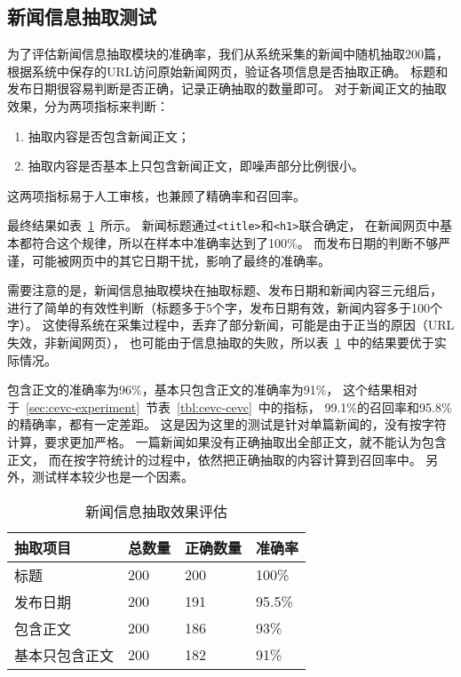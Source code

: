 \subsection{新闻信息抽取测试}

为了评估新闻信息抽取模块的准确率，我们从系统采集的新闻中随机抽取200篇，
根据系统中保存的URL访问原始新闻网页，验证各项信息是否抽取正确。
标题和发布日期很容易判断是否正确，记录正确抽取的数量即可。
对于新闻正文的抽取效果，分为两项指标来判断：
\begin{enumerate}
\item 抽取内容是否包含新闻正文；
\item 抽取内容是否基本上只包含新闻正文，即噪声部分比例很小。
\end{enumerate}
这两项指标易于人工审核，也兼顾了精确率和召回率。

最终结果如表~\ref{tbl:title-date}~所示。
新闻标题通过\texttt{<title>}和\texttt{<h1>}联合确定，
在新闻网页中基本都符合这个规律，所以在样本中准确率达到了100\%。
而发布日期的判断不够严谨，可能被网页中的其它日期干扰，影响了最终的准确率。

需要注意的是，新闻信息抽取模块在抽取标题、发布日期和新闻内容三元组后，
进行了简单的有效性判断（标题多于5个字，发布日期有效，新闻内容多于100个字）。
这使得系统在采集过程中，丢弃了部分新闻，可能是由于正当的原因（URL失效，非新闻网页），
也可能由于信息抽取的失败，所以表~\ref{tbl:title-date}~中的结果要优于实际情况。

包含正文的准确率为96\%，基本只包含正文的准确率为91\%，
这个结果相对于~\ref{sec:cevc-experiment}~节表~\ref{tbl:cevc-cevc}~中的指标，
99.1\%的召回率和95.8\%的精确率，都有一定差距。
这是因为这里的测试是针对单篇新闻的，没有按字符计算，要求更加严格。
一篇新闻如果没有正确抽取出全部正文，就不能认为包含正文，
而在按字符统计的过程中，依然把正确抽取的内容计算到召回率中。
另外，测试样本较少也是一个因素。

\begin{table}[htbp]
\caption{新闻信息抽取效果评估}
\label{tbl:title-date}
\vspace{0.5em}\centering\wuhao
\begin{tabular}{llll}
\toprule[1.5pt]
抽取项目 & 总数量 & 正确数量 & 准确率 \\
\midrule[1pt]
标题 & 200 & 200 & 100\% \\
发布日期 & 200 & 191 & 95.5\% \\  
包含正文 & 200 & 186 & 93\% \\
基本只包含正文 & 200 & 182 & 91\% \\
\bottomrule[1.5pt]
\end{tabular}
\end{table}

